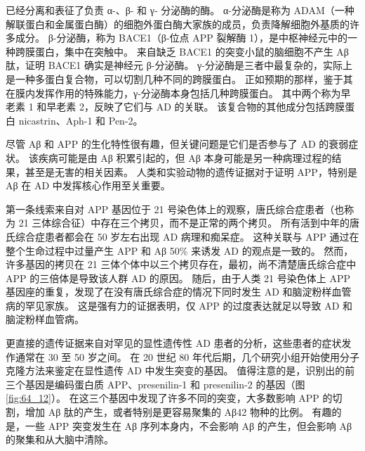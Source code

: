 \begin{figure}[htbp]
	\label{fig:64_11}
\end{figure}


已经分离和表征了负责 α-、β- 和 γ- 分泌酶的酶。
α-分泌酶是称为 ADAM（一种解联蛋白和金属蛋白酶）的细胞外蛋白酶大家族的成员，负责降解细胞外基质的许多成分。
β-分泌酶，称为 BACE1（β-位点 APP 裂解酶 1），是中枢神经元中的一种跨膜蛋白，集中在突触中。
来自缺乏 BACE1 的突变小鼠的脑细胞不产生 Aβ 肽，证明 BACE1 确实是神经元 β-分泌酶。
γ-分泌酶是三者中最复杂的，实际上是一种多蛋白复合物，可以切割几种不同的跨膜蛋白。
正如预期的那样，鉴于其在膜内发挥作用的特殊能力，γ-分泌酶本身包括几种跨膜蛋白。
其中两个称为早老素 1 和早老素 2，反映了它们与 AD 的关联。
该复合物的其他成分包括跨膜蛋白 nicastrin、Aph-1 和 Pen-2。


尽管 Aβ 和 APP 的生化特性很有趣，但关键问题是它们是否参与了 AD 的衰弱症状。
该疾病可能是由 Aβ 积累引起的，但 Aβ 本身可能是另一种病理过程的结果，甚至是无害的相关因素。
人类和实验动物的遗传证据对于证明 APP，特别是 Aβ 在 AD 中发挥核心作用至关重要。


第一条线索来自对 APP 基因位于 21 号染色体上的观察，唐氏综合症患者（也称为 21 三体综合征）中存在三个拷贝，而不是正常的两个拷贝。
所有活到中年的唐氏综合症患者都会在 50 岁左右出现 AD 病理和痴呆症。
这种关联与 APP 通过在整个生命过程中过量产生 APP 和 Aβ 50\% 来诱发 AD 的观点是一致的。
然而，许多基因的拷贝在 21 三体个体中以三个拷贝存在，最初，尚不清楚唐氏综合症中 APP 的三倍体是导致该人群 AD 的原因。
随后，由于人类 21 号染色体上 APP 基因座的重复，发现了在没有唐氏综合症的情况下同时发生 AD 和脑淀粉样血管病的罕见家族。
这是强有力的证据表明，仅 APP 的过度表达就足以导致 AD 和 脑淀粉样血管病。


更直接的遗传证据来自对罕见的显性遗传性 AD 患者的分析，这些患者的症状发作通常在 30 至 50 岁之间。
在 20 世纪 80 年代后期，几个研究小组开始使用分子克隆方法来鉴定在显性遗传 AD 中发生突变的基因。
值得注意的是，识别出的前三个基因是编码蛋白质 APP、presenilin-1 和 presenilin-2 的基因（图 \ref{fig:64_12}）。
在这三个基因中发现了许多不同的突变，大多数影响 APP 的切割，增加 Aβ 肽的产生，或者特别是更容易聚集的 Aβ42 物种的比例。
有趣的是，一些 APP 突变发生在 Aβ 序列本身内，不会影响 Aβ 的产生，但会影响 Aβ 的聚集和从大脑中清除。


